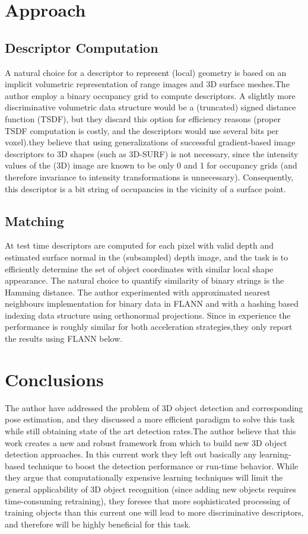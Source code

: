 \documentclass[10pt,twocolumn,letterpaper]{article}
\begin{document}
\section{Approach}
\subsection{Descriptor Computation}
A natural choice for a descriptor to represent (local) geometry
is based on an implicit volumetric representation of
range images and 3D surface meshes.The author employ a binary
occupancy grid to compute descriptors. A slightly
more discriminative volumetric data structure would be a
(truncated) signed distance function (TSDF), but they discard
this option for efficiency reasons (proper TSDF computation
is costly, and the descriptors would use several bits per
voxel).they believe that using generalizations of successful
gradient-based image descriptors to 3D shapes (such as 3D-SURF\cite{Knopp2010Hough}) is not necessary, since the intensity values of
the (3D) image are known to be only 0 and 1 for occupancy
grids (and therefore invariance to intensity transformations
is unnecessary). Consequently, this descriptor is a bit string of occupancies in the vicinity of a surface point.
\subsection{Matching}
At test time descriptors are computed for each pixel
with valid depth and estimated surface normal in the (subsampled)
depth image, and the task is to efficiently determine
the set of object coordinates with similar local shape
appearance. The natural choice to quantify similarity of binary
strings is the Hamming distance. The author experimented
with approximated nearest neighbours implementation for
binary data in FLANN\cite{Muja2012Fast} and with a hashing based indexing
data structure using orthonormal projections.
Since in experience the performance is roughly similar
for both acceleration strategies,they only report the results
using FLANN below.
\section{Conclusions}
The author have addressed the problem of 3D object detection
and corresponding pose estimation, and they discussed a
more efficient paradigm to solve this task while still obtaining
state of the art detection rates.The author believe that this work
creates a new and robust framework from which to build
new 3D object detection approaches. In this current work
they left out basically any learning-based technique to boost
the detection performance or run-time behavior. While they
argue that computationally expensive learning techniques
will limit the general applicability of 3D object recognition
(since adding new objects requires time-consuming retraining),
they foresee that more sophisticated processing of training
objects than this current one will lead to more discriminative
descriptors, and therefore will be highly beneficial
for this task.

{\small


}
\end{document}
